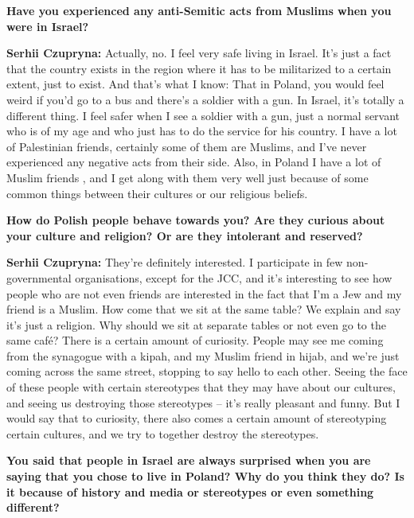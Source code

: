 \textbf{Have you experienced any anti-Semitic acts from Muslims when you were in Israel?}\par
\textbf{Serhii Czupryna:} Actually, no. I feel very safe living in Israel. It’s just a fact that the country exists in the region where it has to be militarized to a certain extent, just to exist. And that’s what I know: That in Poland, you would feel weird if you’d go to a bus and there’s a soldier with a gun. In Israel, it’s totally a different thing. I feel safer when I see a soldier with a gun, just a normal servant who is of my age and who just has to do the service for his country. I have a lot of Palestinian friends, certainly some of them are Muslims, and I’ve never experienced any negative acts from their side. Also, in Poland I have a lot of Muslim friends , and I get along with them very well just because of some common things between their cultures or our religious beliefs. \par 
\textbf{How do Polish people behave towards you? Are they curious about your culture and religion? Or are they intolerant and reserved?}\par
\textbf{Serhii Czupryna:} They’re definitely interested. I participate in few non-governmental organisations, except for the JCC, and it’s interesting to see how people who are not even friends are interested in the fact that I’m a Jew and my friend is a Muslim. How come that we sit at the same table? We explain and say it’s just a religion. Why should we sit at separate tables or not even go to the same café? There is a certain amount of curiosity. People may see me coming from the synagogue with a kipah, and my Muslim friend in hijab, and we’re just coming across the same street, stopping to say hello to each other. Seeing the face of these people with certain stereotypes that they may have about our cultures, and seeing us destroying those stereotypes – it’s really pleasant and funny. But I would say that to curiosity, there also comes a certain amount of stereotyping certain cultures, and we try to together destroy the stereotypes.\par 
\textbf{You said that people in Israel are always surprised when you are saying that you chose to live in Poland? Why do you think they do? Is it because of history and media or stereotypes or even something different?}\par
